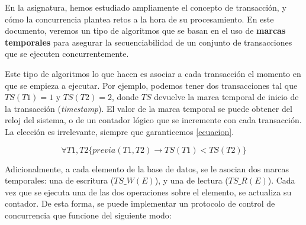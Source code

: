\documentclass[12pt, a4paper]{article}
\title{\size{15pt}{Protocolos de control de concurrencia basados en marcas temporales} \vspace{-2ex}}
\date{\vspace{-5ex}}
\begin{document}
\maketitle
\thispagestyle{empty}

\vspace{-10ex}

En la asignatura, hemos estudiado ampliamente el concepto de transacción, y cómo la concurrencia plantea retos a la hora de su procesamiento. En este documento, veremos un tipo de algoritmos que se basan en el uso de \textbf{marcas temporales} para asegurar la secuenciabilidad de un conjunto de transacciones que se ejecuten concurrentemente.

Este tipo de algoritmos lo que hacen es asociar a cada transacción el momento en que se empieza a ejecutar. Por ejemplo, podemos tener dos transacciones tal que $TS(T1)=1$ y $TS(T2)=2$, donde $TS$ devuelve la marca temporal de inicio de la transacción (\textit{timestamp}). El valor de la marca temporal se puede obtener del reloj del sistema, o de un contador lógico que se incremente con cada transacción. La elección es irrelevante, siempre que garanticemos \ref{ecuacion}.

\begin{equation}
    \forall T1,T2 \{ previa(T1,T2) \rightarrow TS(T1) < TS(T2) \} 
\label{ecuacion}
\end{equation}

Adicionalmente, a cada elemento de la base de datos, se le asocian dos marcas temporales: una de escritura ($TS\_W(E)$), y una de lectura ($TS\_R(E)$). Cada vez que se ejecuta una de las dos operaciones sobre el elemento, se actualiza su contador. De esta forma, se puede implementar un protocolo de control de concurrencia que funcione del siguiente modo:
\end{document}
